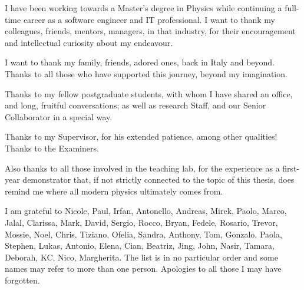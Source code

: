 I have been working towards a Master's degree in Physics
while continuing a full-time career as a software engineer and IT professional.
I want to thank my colleagues, friends, mentors, managers, in that industry,
for their encouragement and intellectual curiosity about my endeavour.

I want to thank my family, friends, adored ones, back in Italy and beyond.
Thanks to all those who have supported this journey, beyond my imagination.

Thanks to my fellow postgraduate students, with whom I have shared
an office, and long, fruitful conversations;
as well as research Staff, and our Senior Collaborator in a special way.

Thanks to my Supervisor, for his extended patience, among other qualities!
Thanks to the Examiners.

Also thanks to all those involved in the teaching lab,
for the experience as a first-year demonstrator that,
if not strictly connected to the topic of this thesis,
does remind me where all modern physics ultimately comes from.

I am grateful to Nicole, Paul, Irfan, Antonello, Andreas, Mirek, Paolo, Marco,
Jalal, Clarissa, Mark, David, Sergio, Rocco, Bryan, Fedele, Rosario, Trevor, Mossie, Noel, Chris, Tiziano, Ofelia,
Sandra, Anthony, Tom, Gonzalo, Paola, Stephen, Lukas, Antonio, Elena, Cian, Beatriz, Jing, John, Nasir, Tamara,
Deborah, KC, Nico, Margherita. The list is in no particular order and some names may refer to more than one person.
Apologies to all those I may have forgotten.
